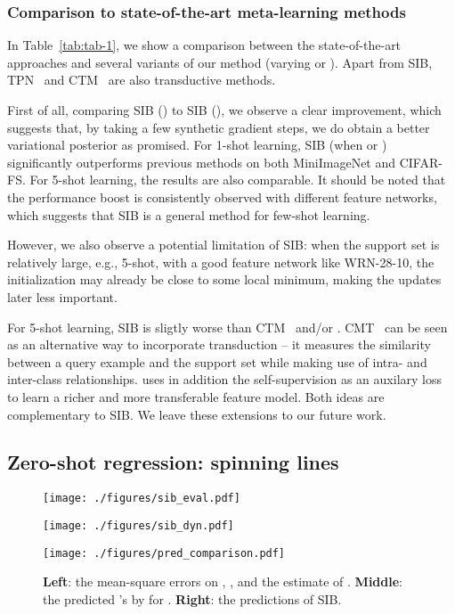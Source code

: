 \documentclass{article} \usepackage{iclr2020_conference,times}
\begin{document}
\subsubsection{Comparison to state-of-the-art meta-learning methods}
\label{sec:sota}

In Table~\ref{tab:tab-1},
we show a comparison between the state-of-the-art approaches 
and several variants of our method (varying  or ).
Apart from SIB, TPN~\citep{liu2018learning} and CTM~\citep{li2019ctm} are also transductive methods.

First of all, comparing SIB () to SIB (), 
we observe a clear improvement, 
which suggests that, by taking a few synthetic gradient steps,
we do obtain a better variational posterior as promised.
For 1-shot learning, SIB (when  or ) significantly outperforms previous methods 
on both MiniImageNet and CIFAR-FS. 
For 5-shot learning, the results are also comparable. 
It should be noted that the performance boost is consistently observed 
with different feature networks,
which suggests that SIB is a general method for few-shot learning.

However, we also observe a potential limitation of SIB:
when the support set is relatively large, e.g., 5-shot,
with a good feature network like WRN-28-10,
the initialization  may already be close to some local minimum,
making the updates later less important.

For 5-shot learning, SIB is sligtly worse than CTM~\citep{li2019ctm} and/or \citet{gidaris2019boosting}.
CMT~\citep{li2019ctm} can be seen as an alternative way to incorporate transduction -- 
it measures the similarity between a query example and the support set while making use of intra- and inter-class relationships.  
\citet{gidaris2019boosting} uses in addition the self-supervision as an auxilary loss to learn a richer and more transferable feature model.
Both ideas are complementary to SIB. We leave these extensions to our future work.


\subsection{Zero-shot regression: spinning lines} 


\begin{figure*}[ht]
	\centering
	\begin{minipage}{.32\textwidth}
		\centering
		\texttt{[image: ./figures/sib\_eval.pdf]}
	\end{minipage} 
	\hfill
	\begin{minipage}{.32\textwidth}
		\centering
		\texttt{[image: ./figures/sib\_dyn.pdf]}
	\end{minipage}
	\hfill
	\begin{minipage}{.32\textwidth}
		\centering
		\texttt{[image: ./figures/pred\_comparison.pdf]}
	\end{minipage}
	\caption{\textbf{Left}: the mean-square errors on ,
        ,  and the estimate
        of .
		\textbf{Middle}: the predicted 's by  for . \textbf{Right}: the predictions of SIB.}
	\label{fig:toy}
\end{figure*}
\end{document}
